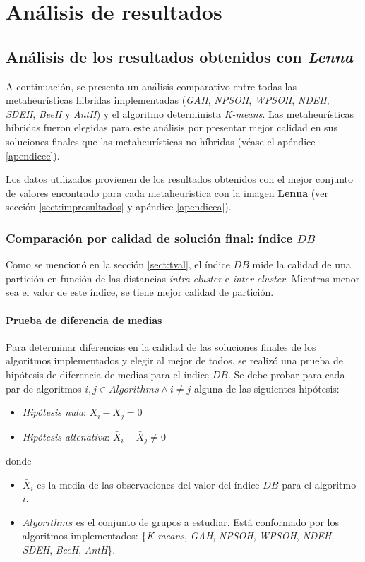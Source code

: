 \chapter{Análisis de resultados}
\label{chap:analisis}

\section{Análisis de los resultados obtenidos con \emph{Lenna}}\label{sect:arimg}

    A continuación, se presenta un análisis comparativo entre todas las
metaheurísticas hibridas implementadas (\emph{GAH}, \emph{NPSOH}, \emph{WPSOH},
\emph{NDEH}, \emph{SDEH}, \emph{BeeH} y \emph{AntH}) y el algoritmo determinista
\emph{K-means}. Las metaheurísticas híbridas fueron elegidas para este análisis
por presentar mejor calidad en sus soluciones finales que las metaheurísticas no
híbridas (véase el apéndice \ref{apendicec}).

    Los datos utilizados provienen de los resultados obtenidos con el mejor
conjunto de valores encontrado para cada metaheurística con la imagen
\textbf{Lenna} (ver sección \ref{sect:impresultados} y apéndice \ref{apendicea}).

\subsection{Comparación por calidad de solución final: índice $DB$}\label{analisis:db}

    Como se mencionó en la sección \ref{sect:tval}, el índice $DB$ mide la
calidad de una partición en función de las distancias \emph{intra-cluster} e
\emph{inter-cluster}. Mientras menor sea el valor de este índice, se tiene mejor
calidad de partición.

\subsubsection{Prueba de diferencia de medias}\label{analisis:db_mean_hip}

    Para determinar diferencias en la calidad de las soluciones finales de los
algoritmos implementados y elegir al mejor de todos, se realizó una prueba de
hipótesis de diferencia de medias para el índice $DB$. Se debe probar para
cada par de algoritmos $i, j \in Algorithms \land i \neq j$ alguna de las
siguientes hipótesis:
\begin{itemize}
    \item \emph{Hipótesis nula}: $\bar{X}_i - \bar{X}_j = 0$
    \item \emph{Hipótesis altenativa}: $\bar{X}_i - \bar{X}_j \neq 0$
\end{itemize}
donde
\begin{itemize}
    \item $\bar{X}_i$ es la media de las observaciones del valor del índice $DB$
          para el algoritmo $i$.
    \item $Algorithms$ es el conjunto de grupos a estudiar. Está conformado por
los algoritmos implementados: \{\emph{K-means}, \emph{GAH}, \emph{NPSOH},
\emph{WPSOH}, \emph{NDEH}, \emph{SDEH}, \emph{BeeH}, \emph{AntH}\}.
\end{itemize}

